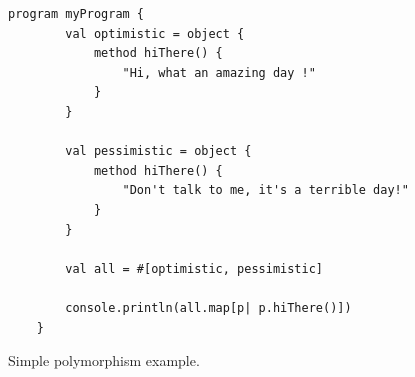 
\begin{figure}[ht]
 \centering
 \begin{lstlisting}[language=Wollok]
	program myProgram {
		val optimistic = object {
			method hiThere() {
				"Hi, what an amazing day !"
			}
		}

		val pessimistic = object {
			method hiThere() {
				"Don't talk to me, it's a terrible day!"
			}
		}
		
		val all = #[optimistic, pessimistic]
		
		console.println(all.map[p| p.hiThere()])
	}
 \end{lstlisting}
 
 \caption{\small Simple polymorphism example.}
 \label{fig:polymorphism}
\end{figure}
